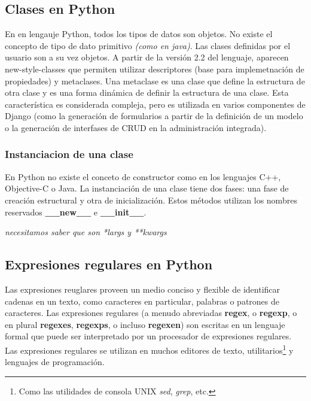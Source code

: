 \documentclass[a4paper]{report}
\begin{document}
\subsection{Clases en Python}
En en lengauje Python, todos los tipos de datos son objetos. No existe el concepto
de tipo de dato primitivo \emph{(como en java)}. Las clases definidas por el usuario
son a su vez objetos.
A partir de la versión 2.2 del lenguaje, aparecen new-style-classes que permiten 
utilizar descriptores (base para implemetnación de propiedades) y metaclases.
Una metaclase es una clase que define la estructura de otra clase y es una forma dinámica de 
definir la estructura de una clase. Esta característica es considerada compleja, pero es 
utilizada en varios componentes de Django (como la generación de formularios a partir de la definición
de un modelo o la generación de interfases de CRUD en la administración integrada).

\subsubsection*{Instanciacion de una clase}
En Python no existe el conceto de constructor como en los lenguajes C++, Objective-C o 
Java. La instanciación de una clase tiene dos fases: una fase de creación estructural y
otra de inicialización. Estos métodos utilizan los nombres reservados \textbf{\_\_new\_\_} e
\textbf{\_\_init\_\_}.

\emph{necesitamos saber que son *largs y **kwargs}




\subsection{Expresiones regulares en Python}
Las expresiones reuglares proveen un medio conciso y flexible de identificar cadenas en un texto, como
caracteres en particular, palabras o patrones de caracteres. Las expresiones regulares (a menudo
abreviadas \textbf{regex}, o \textbf{regexp}, o en plural \textbf{regexes}, \textbf{regexps}, o incluso \textbf{regexen})
son escritas en un lenguaje formal que puede ser interpretado por un procesador de expresiones regulares.
Las expresiones regulares se utilizan en muchos editores de texto, utilitarios\footnote{
Como las utilidades de consola UNIX \emph{sed}, \emph{grep}, etc.} y lenguajes de programación.
\end{document}
